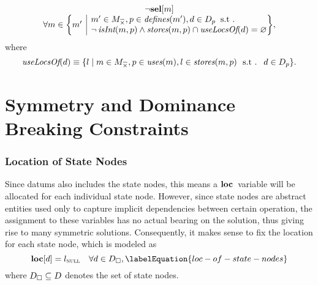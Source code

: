 \begin{equation}
  \begin{array}{c}
    \neg\mVar{sel}[m] \\
    \forall m \in
      \mSetBuilder*{m'}%
                   {%
                     \begin{array}{@{}l@{}}
                       m' \in \mKillMatchCompSet,
                       p \in \mDefines(m'),
                       d \in \mDataSet[p] \hspace{-1pt} \text{ \st} \\
                       \neg\mIsInt(m, p)
                       \mAnd
                       \mStores(m, p) \cap \mUseLocsOf(d) = \mEmptySet
                     \end{array}
                   } \!,
  \end{array}
\end{equation}
%
where
%
\begin{equation}
  \mUseLocsOf(d)
  \equiv
  \mSetBuilder{l}%
              {%
                m \in \mKillMatchCompSet,
                p \in \mUses(m),
                l \in \mStores(m, p)
                \text{ \st }
                d \in \mDataSet[p]
              }.
\end{equation}


\section{Symmetry and Dominance Breaking Constraints}



\subsubsection{Location of State Nodes}

Since \glspl{datum} also includes the \glspl{state node}, this means a
$\mVar{loc}$~\gls{variable} will be allocated for each individual \gls{state
  node}.
%
However, since \glspl{state node} are abstract entities used only to capture
implicit dependencies between certain \gls{operation}, the assignment to these
\glspl{variable} has no actual bearing on the \gls{solution}, thus giving rise
to many symmetric \glspl{solution}.
%
Consequently, it makes sense to fix the location for each \gls{state node},
which is modeled as
%
\begin{equation}
  \mVar{loc}[d] = \mNullLocation
  \mQuantSep
  \forall d \in \mStateDataSet,
  \labelEquation{loc-of-state-nodes}
\end{equation}
%
where \mbox{$\mStateDataSet \subseteq \mDataSet$} denotes the set of
\glspl{state node}.


